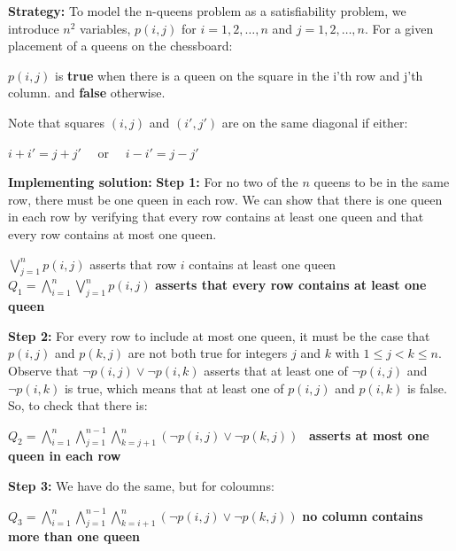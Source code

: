 \begin{tcolorbox}[title=Example 1: The n-Queens Problem (1/2)]
\raggedright
\textbf{Strategy:} \newline 
To model the n-queens problem as a satisfiability problem, we introduce $n^2$ variables, $p(i,j)$ for $i = 1,2, \ldots, n$ and $j = 1,2, \ldots, n$.
\newline For a given placement of a queens on the chessboard:
\begin{center}
$p(i, j)$ is \textbf{true} when there is a queen on the square in the i'th row and j'th column. \newline and \textbf{false} otherwise.
\end{center}
Note that squares $(i,j)$ and $(i', j')$ are on the same diagonal if either:
\begin{center}
$i+ i' = j+ j'$ \ \ or \ \ $i-i' = j - j'$    
\end{center}
\textbf{Implementing solution:} \newline
\textbf{Step 1:}
For no two of the $n$ queens to be in the same row, there must be one queen in each row. We
can show that there is one queen in each row by verifying that every row contains at least one
queen and that every row contains at most one queen. 
\begin{center}
$\bigvee_{j=1}^{n} p(i,j)$ asserts that
row $i$ contains at least one queen \newline
$Q_1 = \bigwedge_{i=1}^{n} \bigvee_{j=1}^{n} p(i,j)$ \textbf{asserts that every row contains at least one queen}
\end{center}
\textbf{Step 2:} For every row to include at most one queen, it must be the case that $p(i, j)$ and $p(k, j)$ are
not both true for integers $j$ and $k$ with $1 \leq j < k \leq n$. \newline
Observe that $\neg p(i,j) \lor \neg p(i,k)$ asserts that at least one of $\neg p(i,j)$ and $\neg p(i,k)$  is true, which means that at least one of $p(i, j)$ and $p(i, k)$ is false.
So, to check that there is: 
\begin{center}
$Q_2 = \bigwedge_{i=1}^n \bigwedge_{j=1}^{n-1} \bigwedge_{k=j+1}^{n} (\neg p(i,j) \lor \neg p(k,j)) $    \ \textbf{asserts at most one queen in each row}
\end{center}
\textbf{Step 3:} We have do the same, but for coloumns:
\begin{center}
$Q_3 = \bigwedge_{i=1}^n \bigwedge_{j=1}^{n-1} \bigwedge_{k=i+1}^{n} (\neg p(i,j) \lor \neg p(k,j)) $     \textbf{no column contains more than one queen}
\end{center}   
\end{tcolorbox}

